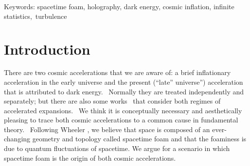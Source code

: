 \documentclass[12pt]{article}
\begin{document}
\vspace{1cm}


\begin{abstract}

Quantum fluctuations endow spacetime with a foamy texture.  The degree of
foaminess is dictated by blackhole physics to
be of the holographic type.  Applied to cosmology, the holographic foam model
predicts the existence of dark energy with
critical energy density in the current (late) universe, the quanta 
of which obey 
infinite statistics. Furthermore we use the deep similarities between 
turbulence and the spacetime
foam phase of strong quantum gravity to argue that the early universe
was in a turbulent regime when it underwent a brief cosmic inflation with a 
``graceful" transition to a laminar regime.  In this scenario, both the late and
the early cosmic accelerations have their origins in spacetime foam.

 
\end{abstract}


\vspace{1cm}



Keywords: spacetime foam, holography, dark energy, 
cosmic inflation, infinite statistics, turbulence\\ 



\newpage

\section{Introduction}

There are two cosmic accelerations that we are aware of: a brief inflationary
acceleration \cite{inflat} in the early universe and the present 
(“late” universe”) acceleration \cite{SNa}  that is attributed to dark energy. 
Normally they are treated independently
and separately; but there are also some works \cite{BG,others} that 
consider both
regimes of accelerated expansions. 
We think it is conceptually necessary and aesthetically
pleasing to trace both cosmic
accelerations to a common cause in fundamental theory.  Following Wheeler \cite{Wheeler}, we
believe that space is composed of
an ever-changing geometry and topology called spacetime foam and that the
foaminess is due to quantum fluctuations
of spacetime. We argue for a scenario in which spacetime foam is the origin of 
both cosmic accelerations.\\
\end{document}
